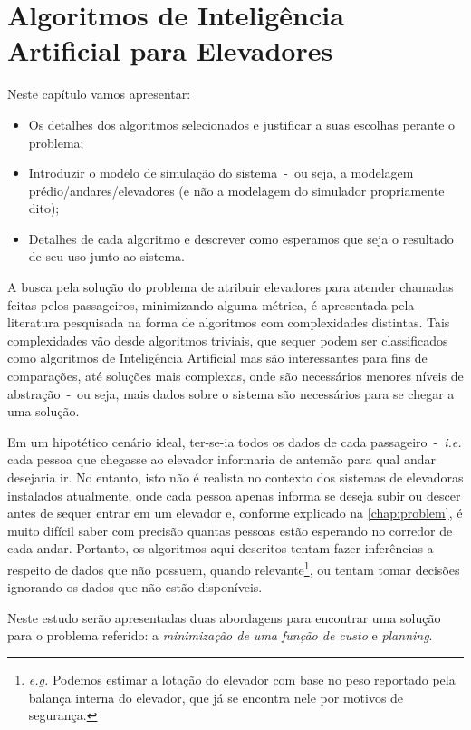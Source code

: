 \chapter{\label{chap:ai}Algoritmos de Inteligência Artificial para Elevadores}

Neste capítulo vamos apresentar:

\begin{itemize}
\item Os detalhes dos algoritmos selecionados e justificar a suas escolhas perante o problema;
\item Introduzir o modelo de simulação do sistema~-~ou seja, a modelagem
prédio/andares/elevadores (e não a modelagem do simulador propriamente dito);
\item Detalhes de cada algoritmo e descrever como esperamos que seja o resultado de seu uso junto ao sistema.
\end{itemize}

A busca pela solução do problema de atribuir elevadores para atender chamadas
feitas pelos passageiros, minimizando alguma métrica, é apresentada pela
literatura pesquisada na forma de algoritmos com complexidades distintas. Tais
complexidades vão desde algoritmos triviais, que sequer podem ser classificados
como algoritmos de Inteligência Artificial mas são interessantes para fins de
comparações, até soluções mais complexas, onde são necessários menores níveis de
abstração~-~ou seja, mais dados sobre o sistema são necessários para se chegar
a uma solução.

Em um hipotético cenário ideal, ter-se-ia todos os dados de cada
passageiro~-~\textit{i.e.} cada pessoa que chegasse ao elevador informaria de
antemão para qual andar desejaria ir. No entanto, isto não é realista no
contexto dos sistemas de elevadoras instalados atualmente, onde cada pessoa
apenas informa se deseja subir ou descer antes de sequer entrar em um elevador
e, conforme explicado na \ref{chap:problem}, é muito difícil saber com precisão
quantas pessoas estão esperando no corredor de cada andar. Portanto, os
algoritmos aqui descritos tentam fazer inferências a respeito de dados que não
possuem, quando relevante\footnote{\textit{e.g.} Podemos estimar a lotação do
elevador com base no peso reportado pela balança interna do elevador, que já se
encontra nele por motivos de segurança.}, ou tentam tomar decisões ignorando os
dados que não estão disponíveis.

Neste estudo serão apresentadas duas abordagens para encontrar uma solução para
o problema referido: a \textit{minimização de uma função de custo} e
\textit{planning}.

